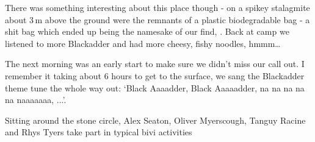 There was something interesting about this place though - on a spikey stalagmite about 3\,m above the ground were the remnants of a plastic biodegradable bag - a shit bag which ended up being the namesake of our find, . Back at camp we listened to more Blackadder and had more cheesy, fishy noodles, hmmm…

The next morning was an early start to make sure we didn’t miss our call out. I remember it taking about 6 hours to get to the surface, we sang the Blackadder theme tune the whole way out: `Black Aaaadder, Black Aaaaadder, na na na na na naaaaaaa, ...'.


\begin{pagefigure}
\centering
{}
\caption{Sitting around the stone circle, Alex Seaton, Oliver Myerscough, Tanguy Racine and Rhys Tyers take part in typical bivi activities } \label{people in the bivi}
\end{pagefigure}

